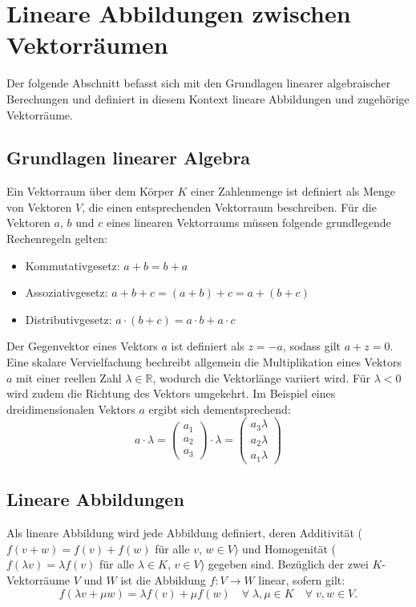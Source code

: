 \section{Lineare Abbildungen zwischen Vektorräumen}
Der folgende Abschnitt befasst sich mit den Grundlagen linearer algebraischer Berechungen und definiert in diesem Kontext lineare Abbildungen und zugehörige Vektorräume.

\subsection{Grundlagen linearer Algebra}
Ein Vektorraum über dem Körper $K$ einer Zahlenmenge ist definiert als Menge von Vektoren $V$, die einen entsprechenden Vektorraum beschreiben. Für die Vektoren $a$, $b$ und $c$ eines linearen Vektorraums müssen folgende grundlegende Rechenregeln gelten:
\begin{itemize}
\item Kommutativgesetz: $a + b = b + a$
\item Assoziativgesetz: $a + b + c = (a + b) + c = a + (b + c)$
\item Distributivgesetz: $a \cdot (b + c) = a \cdot b + a \cdot c$
\end{itemize}

Der Gegenvektor eines Vektors $a$ ist definiert als $z = -a$, sodass gilt $a + z = 0$. Eine skalare Vervielfachung bechreibt allgemein die Multiplikation eines Vektors $a$ mit einer reellen Zahl $\lambda \in \mathbb{R}$, wodurch die Vektorlänge variiert wird. Für $\lambda < 0$ wird zudem die Richtung des Vektors umgekehrt. Im Beispiel eines dreidimensionalen Vektors $a$ ergibt sich dementsprechend:
\begin{equation}
a \cdot \lambda = \left(\begin{array}{c} a_1 \\ a_2 \\ a_3 \end{array}\right)\cdot \lambda=\left(\begin{array}{c} a_3 \lambda \\ a_2 \lambda \\ a_1 \lambda \end{array}\right)
\end{equation}

\subsection{Lineare Abbildungen}
Als lineare Abbildung wird jede Abbildung definiert, deren Additivität ($f(v + w) = f(v) + f(w)$ für alle $v$, $w \in V$) und Homogenität ($f(\lambda v) = \lambda f(v)$ für alle $\lambda \in K$, $v \in V$) gegeben sind. Bezüglich der zwei $K$-Vektorräume $V$ und $W$ ist die Abbildung $f: V \rightarrow W$ linear, sofern gilt:
\begin{equation}
f(\lambda v + \mu w)=\lambda f(v) + \mu f(w) \quad \forall \; \lambda, \mu \in K \quad \forall \; v, w \in V.
\end{equation}

